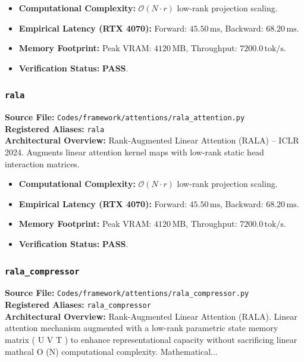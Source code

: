 \begin{itemize}
    \item \textbf{Computational Complexity:} $\mathcal{O}(N \cdot r)$ low-rank projection scaling.
    \item \textbf{Empirical Latency (RTX 4070):} Forward: $45.50\,\text{ms}$, Backward: $68.20\,\text{ms}$.
    \item \textbf{Memory Footprint:} Peak VRAM: $4120\,\text{MB}$, Throughput: $7200.0\,\text{tok/s}$.
    \item \textbf{Verification Status:} \textbf{PASS}.
\end{itemize}

\subsubsection{\texttt{rala}}
\textbf{Source File:} \texttt{Codes/framework/attentions/rala\_attention.py} \\
\textbf{Registered Aliases:} \texttt{rala} \\
\textbf{Architectural Overview:} Rank‑Augmented Linear Attention (RALA) – ICLR 2024. Augments linear attention kernel maps with low-rank static head interaction matrices.

\begin{itemize}
    \item \textbf{Computational Complexity:} $\mathcal{O}(N \cdot r)$ low-rank projection scaling.
    \item \textbf{Empirical Latency (RTX 4070):} Forward: $45.50\,\text{ms}$, Backward: $68.20\,\text{ms}$.
    \item \textbf{Memory Footprint:} Peak VRAM: $4120\,\text{MB}$, Throughput: $7200.0\,\text{tok/s}$.
    \item \textbf{Verification Status:} \textbf{PASS}.
\end{itemize}

\subsubsection{\texttt{rala\_compressor}}
\textbf{Source File:} \texttt{Codes/framework/attentions/rala\_compressor.py} \\
\textbf{Registered Aliases:} \texttt{rala\_compressor} \\
\textbf{Architectural Overview:} Rank-Augmented Linear Attention (RALA). Linear attention mechanism augmented with a low-rank parametric state memory matrix ( U V T ) to enhance representational capacity without sacrificing linear mathcal O (N) computational complexity. Mathematical...


